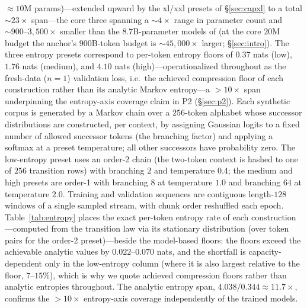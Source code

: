 \documentclass[11pt]{article}
\begin{document}
${\approx}10$M params)---extended upward by the xl/xxl presets of \S\ref{sec:capxl} to a
total ${\sim}23\times$ span---the core three spanning a ${\sim}4\times$ range in parameter count and
${\sim}900$--$3{,}500\times$ smaller than the $8.7$B-parameter models of
\citet{muennighoff2023scaling} (at the core $20$M budget the anchor's $900$B-token
budget is ${\sim}45{,}000\times$ larger; \S\ref{sec:intro}). The three entropy presets
correspond to per-token entropy floors of $0.37$ nats (low), $1.76$ nats (medium), and
$4.10$ nats (high)---operationalized throughout as the fresh-data ($n{=}1$) validation
loss, i.e.\ the achieved compression floor of each construction rather than its analytic
Markov entropy---a ${>}10\times$ span underpinning the entropy-axis coverage claim in
P2 (\S\ref{sec:p2}). Each synthetic corpus is generated by a Markov chain over a
$256$-token alphabet whose successor distributions are constructed, per context, by
assigning Gaussian logits to a fixed number of allowed successor tokens (the
branching factor) and applying a softmax at a preset temperature; all other
successors have probability zero. The low-entropy preset uses an order-2 chain (the
two-token context is hashed to one of $256$ transition rows) with branching $2$ and
temperature $0.4$; the medium and high presets are order-1 with branching $8$ at
temperature $1.0$ and branching $64$ at temperature $2.0$. Training and validation
sequences are contiguous length-$128$ windows of a single sampled stream, with chunk
order reshuffled each epoch. Table~\ref{tab:entropy} places the exact per-token
entropy rate of each construction---computed from the transition law via its
stationary distribution (over token pairs for the order-2 preset)---beside the
model-based floors: the floors exceed the achievable analytic values by
$0.022$--$0.070$ nats, and the shortfall is capacity-dependent only in the
low-entropy column (where it is also largest relative to the floor,
$7$--$15\%$), which is why we quote achieved compression floors rather than
analytic entropies throughout. The analytic entropy span,
$4.038/0.344 \approx 11.7\times$, confirms the ${>}10\times$ entropy-axis coverage
independently of the trained models.
\end{document}
